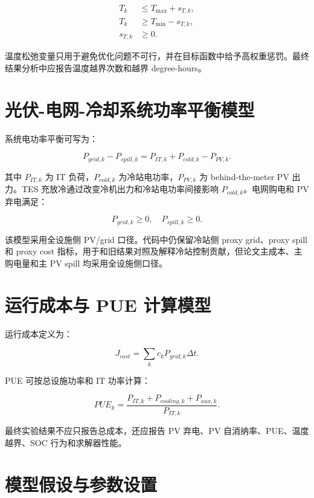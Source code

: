 \documentclass[UTF8,a4paper,12pt]{ctexrep}
\begin{document}
\begin{align}
  T_k &\leq T_{\max}+s_{T,k}, \\
  T_k &\geq T_{\min}-s_{T,k}, \\
  s_{T,k} &\geq 0.
\end{align}

温度松弛变量只用于避免优化问题不可行，并在目标函数中给予高权重惩罚。最终结果分析中应报告温度越界次数和越界 degree-hours。

\section{光伏-电网-冷却系统功率平衡模型}

系统电功率平衡可写为：

\begin{equation}
  P_{grid,k} - P_{spill,k}
  =
  P_{IT,k}
  + P_{cold,k}
  - P_{PV,k}.
  \label{eq:power_balance}
\end{equation}

其中 $P_{IT,k}$ 为 IT 负荷，$P_{cold,k}$ 为冷站电功率，$P_{PV,k}$ 为 behind-the-meter PV 出力。TES 充放冷通过改变冷机出力和冷站电功率间接影响 $P_{cold,k}$。电网购电和 PV 弃电满足：

\begin{equation}
  P_{grid,k}\geq 0,\quad P_{spill,k}\geq 0.
\end{equation}

该模型采用全设施侧 PV/grid 口径。代码中仍保留冷站侧 proxy grid、proxy spill 和 proxy cost 指标，用于和旧结果对照及解释冷站控制贡献，但论文主成本、主购电量和主 PV spill 均采用全设施侧口径。

\section{运行成本与 PUE 计算模型}

运行成本定义为：

\begin{equation}
  J_{cost}=\sum_{k} c_k P_{grid,k}\Delta t.
\end{equation}

PUE 可按总设施功率和 IT 功率计算：

\begin{equation}
  PUE_k=\frac{P_{IT,k}+P_{cooling,k}+P_{aux,k}}{P_{IT,k}}.
\end{equation}

最终实验结果不应只报告总成本，还应报告 PV 弃电、PV 自消纳率、PUE、温度越界、SOC 行为和求解器性能。

\section{模型假设与参数设置}
\end{document}
